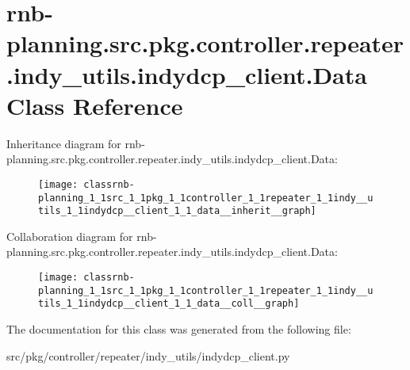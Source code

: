 \hypertarget{classrnb-planning_1_1src_1_1pkg_1_1controller_1_1repeater_1_1indy__utils_1_1indydcp__client_1_1_data}{}\section{rnb-\/planning.src.\+pkg.\+controller.\+repeater.\+indy\+\_\+utils.\+indydcp\+\_\+client.\+Data Class Reference}
\label{classrnb-planning_1_1src_1_1pkg_1_1controller_1_1repeater_1_1indy__utils_1_1indydcp__client_1_1_data}


Inheritance diagram for rnb-\/planning.src.\+pkg.\+controller.\+repeater.\+indy\+\_\+utils.\+indydcp\+\_\+client.\+Data\+:\nopagebreak
\begin{figure}[H]
\begin{center}
\leavevmode
\texttt{[image: classrnb-planning\_1\_1src\_1\_1pkg\_1\_1controller\_1\_1repeater\_1\_1indy\_\_utils\_1\_1indydcp\_\_client\_1\_1\_data\_\_inherit\_\_graph]}
\end{center}
\end{figure}


Collaboration diagram for rnb-\/planning.src.\+pkg.\+controller.\+repeater.\+indy\+\_\+utils.\+indydcp\+\_\+client.\+Data\+:\nopagebreak
\begin{figure}[H]
\begin{center}
\leavevmode
\texttt{[image: classrnb-planning\_1\_1src\_1\_1pkg\_1\_1controller\_1\_1repeater\_1\_1indy\_\_utils\_1\_1indydcp\_\_client\_1\_1\_data\_\_coll\_\_graph]}
\end{center}
\end{figure}


The documentation for this class was generated from the following file\+:\begin{DoxyCompactItemize}
\item 
src/pkg/controller/repeater/indy\+\_\+utils/indydcp\+\_\+client.\+py\end{DoxyCompactItemize}
